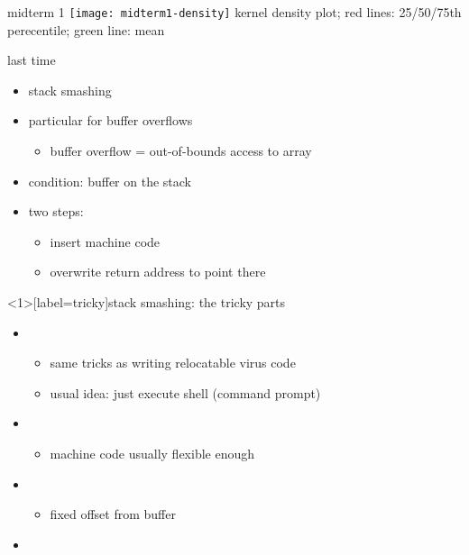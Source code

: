 \begin{frame}
    \titlepage
\end{frame}

\begin{frame}{midterm 1}
    \vspace{-.75cm}
    \texttt{[image: midterm1-density]}
    \vspace{-.75cm}
    {\small kernel density plot; red lines: 25/50/75th perecentile; green line: mean}
\end{frame}

\begin{frame}{last time}
    \begin{itemize}
    \item stack smashing
    \item particular  for buffer overflows
        \begin{itemize}
        \item buffer overflow = out-of-bounds access to array
        \end{itemize}
    \item condition: buffer on the stack
    \item two steps:
        \begin{itemize}
        \item insert machine code
        \item overwrite return address to point there
        \end{itemize}
    \end{itemize}
\end{frame}

\begin{frame}<1>[label=tricky]{stack smashing: the tricky parts}
    \begin{itemize}
    \item {}
        \begin{itemize}
        \item same tricks as writing relocatable virus code
        \item usual idea: just execute shell (command prompt)
        \end{itemize}
    \item {}
        \begin{itemize}
        \item machine code usually flexible enough
        \end{itemize}
    \item {}
        \begin{itemize}
        \item fixed offset from buffer
        \end{itemize}
    \item {}
    \end{itemize}
\end{frame}

